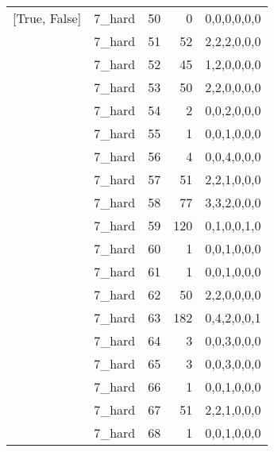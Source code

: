 \begin{tabular}{llrrl}
 [True, False]   & 7\_hard              &            50 &                     0 & 0,0,0,0,0,0   \\
 [True, False]   & 7\_hard              &            51 &                    52 & 2,2,2,0,0,0   \\
 [True, False]   & 7\_hard              &            52 &                    45 & 1,2,0,0,0,0   \\
 [True, False]   & 7\_hard              &            53 &                    50 & 2,2,0,0,0,0   \\
 [True, False]   & 7\_hard              &            54 &                     2 & 0,0,2,0,0,0   \\
 [True, False]   & 7\_hard              &            55 &                     1 & 0,0,1,0,0,0   \\
 [True, False]   & 7\_hard              &            56 &                     4 & 0,0,4,0,0,0   \\
 [True, False]   & 7\_hard              &            57 &                    51 & 2,2,1,0,0,0   \\
 [True, False]   & 7\_hard              &            58 &                    77 & 3,3,2,0,0,0   \\
 [True, False]   & 7\_hard              &            59 &                   120 & 0,1,0,0,1,0   \\
 [True, False]   & 7\_hard              &            60 &                     1 & 0,0,1,0,0,0   \\
 [True, False]   & 7\_hard              &            61 &                     1 & 0,0,1,0,0,0   \\
 [True, False]   & 7\_hard              &            62 &                    50 & 2,2,0,0,0,0   \\
 [True, False]   & 7\_hard              &            63 &                   182 & 0,4,2,0,0,1   \\
 [True, False]   & 7\_hard              &            64 &                     3 & 0,0,3,0,0,0   \\
 [True, False]   & 7\_hard              &            65 &                     3 & 0,0,3,0,0,0   \\
 [True, False]   & 7\_hard              &            66 &                     1 & 0,0,1,0,0,0   \\
 [True, False]   & 7\_hard              &            67 &                    51 & 2,2,1,0,0,0   \\
 [True, False]   & 7\_hard              &            68 &                     1 & 0,0,1,0,0,0   \\

\end{tabular}
